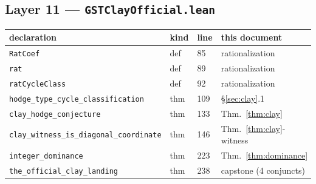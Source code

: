 \documentclass[11pt,a4paper]{article}
\theoremstyle{plain}
\theoremstyle{definition}
\begin{document}
\subsection{Layer 11 --- \texttt{GSTClayOfficial.lean}}
\begingroup\small
\begin{longtable}{@{}p{4.6cm}p{1.0cm}p{1.1cm}p{7.0cm}@{}}
\toprule
declaration & kind & line & this document \\
\midrule
\texttt{RatCoef} & def & 85 & rationalization \\
\texttt{rat} & def & 89 & rationalization \\
\texttt{ratCycleClass} & def & 92 & rationalization \\
\texttt{hodge\_type\_cycle\_classification} & thm & 109 & \S\ref{sec:clay}.1 \\
\texttt{clay\_hodge\_conjecture} & thm & 133 & Thm.~\ref{thm:clay} \\
\texttt{clay\_witness\_is\_diagonal\_coordinate} & thm & 146 & Thm.~\ref{thm:clay}-witness \\
\texttt{integer\_dominance} & thm & 223 & Thm.~\ref{thm:dominance} \\
\texttt{the\_official\_clay\_landing} & thm & 238 & capstone (4 conjuncts) \\
\bottomrule
\end{longtable}
\endgroup
\end{document}
